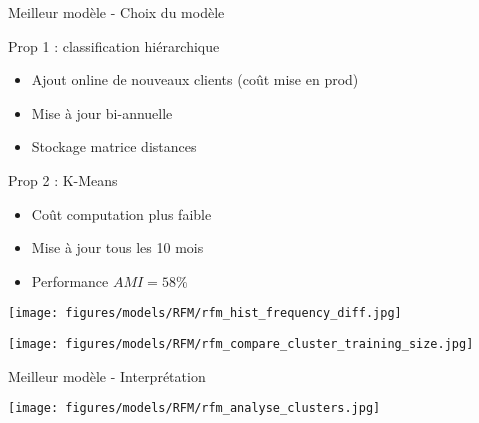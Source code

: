 \documentclass[10pt]{beamer}
\begin{document}
\begin{frame}{Meilleur modèle - Choix du modèle}
    \begin{minipage}{0.51\linewidth}
        Prop 1 : classification hiérarchique 
        \begin{itemize}
            \item Ajout online de nouveaux clients (coût mise en prod)
            \item Mise à jour bi-annuelle
            \item Stockage matrice distances
        \end{itemize}
    \end{minipage}
    \begin{minipage}{0.47\linewidth}
        \item 
        Prop 2 : K-Means 
        \begin{itemize}
            \item Coût computation plus faible
            \item Mise à jour tous les 10 mois
            \item Performance $AMI = 58\%$
        \end{itemize}
    \end{minipage}
    
    \vspace{0.2cm}
    \begin{minipage}{0.45\linewidth}
        \begin{center}
            \texttt{[image: figures/models/RFM/rfm\_hist\_frequency\_diff.jpg]}
        \end{center}
    \end{minipage}
    \begin{minipage}{0.06\linewidth}
    \hfill
    \end{minipage}
    \begin{minipage}{0.45\linewidth}
        \begin{center}
            \texttt{[image: figures/models/RFM/rfm\_compare\_cluster\_training\_size.jpg]}
        \end{center}
    \end{minipage}
\end{frame}
\begin{frame}{Meilleur modèle - Interprétation}
    \begin{center}
        \texttt{[image: figures/models/RFM/rfm\_analyse\_clusters.jpg]}
    \end{center}
\end{frame}
\end{document}
